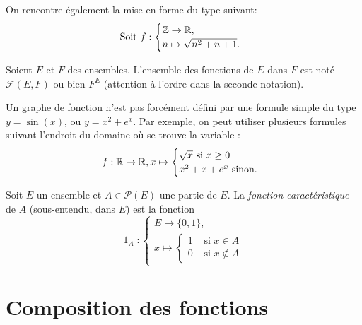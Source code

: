 On rencontre également la mise en forme du type suivant:
\[
\text{ Soit } f :\begin{cases}\mathbb{Z} \to \mathbb{R},\\ n\mapsto \sqrt{n^2+n+1}.\end{cases}
\]
\begin{definition}
Soient $E$ et $F$ des ensembles. L'ensemble des fonctions de $E$ dans $F$ est noté $\mathcal F(E,F)$ ou bien $F^E$ (attention à l'ordre dans la seconde notation).
\end{definition}

\begin{remarque} Un graphe de fonction n'est pas forcément défini par une formule simple du type $y=\sin(x)$, ou $y=x^2+e^x$. Par exemple, on peut utiliser plusieurs formules suivant l'endroit du domaine où se trouve la variable :
\[ f: 
\R \to \R, 
x\mapsto \begin{cases}\sqrt{x}\text{ si }x\geq 0\\ x^2+x+e^x\text{ sinon.}\end{cases}\]
\end{remarque}

\begin{definition}
Soit $E$ un ensemble et $A\in \mathcal P(E)$ une partie de $E$. La \emph{fonction caractéristique} de $A$ (sous-entendu, dans $E$) est la fonction 
\[
\operatorname{1}_A :\begin{cases}E \to \{0,1\},\\ x\mapsto \begin{cases}1&\text{ si } x\in A\\0&\text{ si } x\not\in A\end{cases}\end{cases}
\]
\end{definition}

\section{Composition des fonctions}



